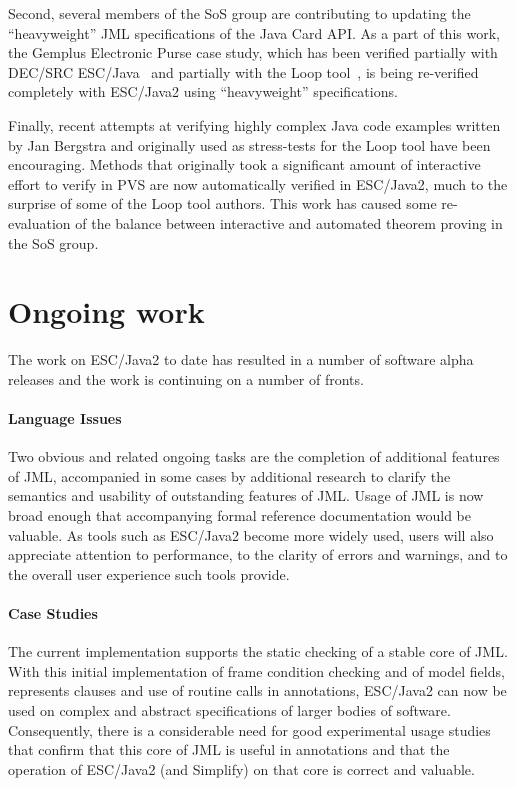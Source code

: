 \documentclass{sig-alternate}
\begin{document}
Second, several members of the SoS group are contributing to updating
the ``heavyweight'' JML specifications of the Java Card API.  As a
part of this work, the Gemplus Electronic Purse case study, which has
been verified partially with DEC/SRC ESC/Java~\cite{CatanoHuisman02}
and partially with the Loop tool~\cite{BreunesseJacobsBerg02}, is being
re-verified completely with ESC/Java2 using ``heavyweight''
specifications.

Finally, recent attempts at verifying highly complex Java code
examples written by Jan Bergstra and originally used as stress-tests
for the Loop tool have been encouraging.  Methods that originally took
a significant amount of interactive effort to verify in PVS are now
automatically verified in ESC/Java2, much to the surprise of some of
the Loop tool authors.  This work has caused some re-evaluation of the
balance between interactive and automated theorem proving in the SoS
group.



\section{Ongoing work}
The work on ESC/Java2 to date has resulted in a number of software
alpha releases and the work is continuing on a number of fronts.

\paragraph*{Language Issues} Two obvious and related ongoing tasks are
the completion of additional features of JML, accompanied in some
cases by additional research to clarify the semantics and usability of
outstanding features of JML.  Usage of JML is now broad enough that
accompanying formal reference documentation would be valuable.  As
tools such as ESC/Java2 become more widely used, users will also
appreciate attention to performance, to the clarity of errors and
warnings, and to the overall user experience such tools provide.

\paragraph*{Case Studies} The current implementation supports the
static checking of a stable core of JML.  With this initial
implementation of frame condition checking and of model fields,
represents clauses and use of routine calls in annotations, ESC/Java2
can now be used on complex and abstract specifications of larger
bodies of software.  Consequently, there is a considerable need for
good experimental usage studies that confirm that this core of JML is
useful in annotations and that the operation of ESC/Java2 (and
Simplify) on that core is correct and valuable.
\end{document}

